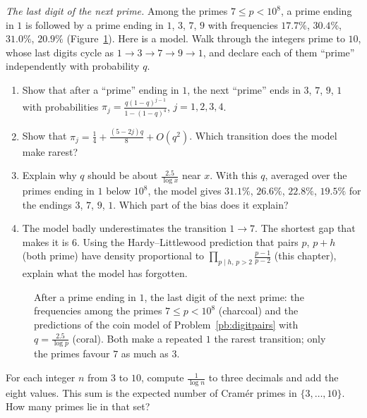 \begin{exercise}[$\star\star$]\label{pb:digitpairs}
\emph{The last digit of the next prime.} Among the primes $7\le p<10^8$, a prime ending in $1$ is followed by a prime ending in $1$, $3$, $7$, $9$ with frequencies
$17.7\%$, $30.4\%$, $31.0\%$, $20.9\%$ (Figure~\ref{fig:digits}). Here is a model. Walk through the integers prime to $10$, whose last digits cycle as
$1\to3\to7\to9\to1$, and declare each of them ``prime'' independently with probability $q$.
\begin{enumerate}[label=(\alph*)]
\item Show that after a ``prime'' ending in $1$, the next ``prime'' ends in $3$, $7$, $9$, $1$ with probabilities $\pi_j=\frac{q(1-q)^{j-1}}{1-(1-q)^4}$, $j=1,2,3,4$.
\item Show that $\pi_j=\frac14+\frac{(5-2j)q}8+O(q^2)$. Which transition does the model make rarest?
\item Explain why $q$ should be about $\frac{2.5}{\log x}$ near $x$. With this $q$, averaged over the primes ending in $1$ below $10^8$, the model gives $31.1\%$, $26.6\%$, $22.8\%$, $19.5\%$
for the endings $3$, $7$, $9$, $1$. Which part of the bias does it explain?
\item The model badly underestimates the transition $1\to7$. The shortest gap that makes it is $6$. Using the Hardy--Littlewood prediction that pairs $p$, $p+h$ (both prime) have
density proportional to $\prod_{p\mid h,\,p>2}\frac{p-1}{p-2}$ (this chapter), explain what the model has forgotten.
\end{enumerate}
\end{exercise}

\begin{figure}[ht]
\centering
{}
\caption{After a prime ending in $1$, the last digit of the next prime: the frequencies among the primes $7\le p<10^8$ (charcoal) and the predictions of the coin model of
Problem~\ref{pb:digitpairs} with $q=\frac{2.5}{\log p}$ (coral). Both make a repeated $1$ the rarest transition; only the primes favour $7$ as much as $3$.}
\label{fig:digits}
\end{figure}

\begin{exercise}[$\star$]\label{ex:coinprobs}
For each integer $n$ from $3$ to $10$, compute $\frac1{\log n}$ to three decimals and add the eight values. This sum is the expected number of Cramér primes in $\{3,\dots,10\}$. How many primes lie in that set?
\end{exercise}

